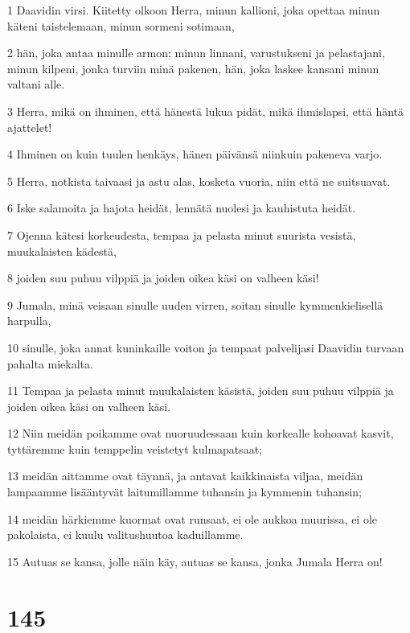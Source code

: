 \par 1 Daavidin virsi. Kiitetty olkoon Herra, minun kallioni, joka opettaa minun käteni taistelemaan, minun sormeni sotimaan,
\par 2 hän, joka antaa minulle armon; minun linnani, varustukseni ja pelastajani, minun kilpeni, jonka turviin minä pakenen, hän, joka laskee kansani minun valtani alle.
\par 3 Herra, mikä on ihminen, että hänestä lukua pidät, mikä ihmislapsi, että häntä ajattelet!
\par 4 Ihminen on kuin tuulen henkäys, hänen päivänsä niinkuin pakeneva varjo.
\par 5 Herra, notkista taivaasi ja astu alas, kosketa vuoria, niin että ne suitsuavat.
\par 6 Iske salamoita ja hajota heidät, lennätä nuolesi ja kauhistuta heidät.
\par 7 Ojenna kätesi korkeudesta, tempaa ja pelasta minut suurista vesistä, muukalaisten kädestä,
\par 8 joiden suu puhuu vilppiä ja joiden oikea käsi on valheen käsi!
\par 9 Jumala, minä veisaan sinulle uuden virren, soitan sinulle kymmenkielisellä harpulla,
\par 10 sinulle, joka annat kuninkaille voiton ja tempaat palvelijasi Daavidin turvaan pahalta miekalta.
\par 11 Tempaa ja pelasta minut muukalaisten käsistä, joiden suu puhuu vilppiä ja joiden oikea käsi on valheen käsi.
\par 12 Niin meidän poikamme ovat nuoruudessaan kuin korkealle kohoavat kasvit, tyttäremme kuin temppelin veistetyt kulmapatsaat;
\par 13 meidän aittamme ovat täynnä, ja antavat kaikkinaista viljaa, meidän lampaamme lisääntyvät laitumillamme tuhansin ja kymmenin tuhansin;
\par 14 meidän härkiemme kuormat ovat runsaat, ei ole aukkoa muurissa, ei ole pakolaista, ei kuulu valitushuutoa kaduillamme.
\par 15 Autuas se kansa, jolle näin käy, autuas se kansa, jonka Jumala Herra on!

\chapter{145}

